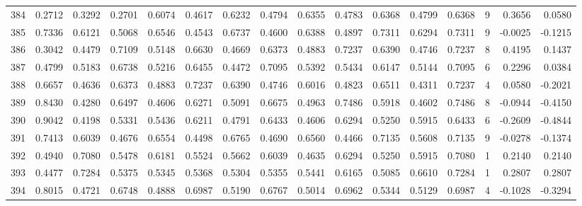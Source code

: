 \begin{tabular}{lrrrrrrrrrrrrrrr}
384 &      0.2712 &  0.3292 &  0.2701 &  0.6074 &  0.4617 &  0.6232 &  0.4794 &  0.6355 &  0.4783 &  0.6368 &   0.4799 &     0.6368 &      9 &                    0.3656 &                     0.0580 \\
385 &      0.7336 &  0.6121 &  0.5068 &  0.6546 &  0.4543 &  0.6737 &  0.4600 &  0.6388 &  0.4897 &  0.7311 &   0.6294 &     0.7311 &      9 &                   -0.0025 &                    -0.1215 \\
386 &      0.3042 &  0.4479 &  0.7109 &  0.5148 &  0.6630 &  0.4669 &  0.6373 &  0.4883 &  0.7237 &  0.6390 &   0.4746 &     0.7237 &      8 &                    0.4195 &                     0.1437 \\
387 &      0.4799 &  0.5183 &  0.6738 &  0.5216 &  0.6455 &  0.4472 &  0.7095 &  0.5392 &  0.5434 &  0.6147 &   0.5144 &     0.7095 &      6 &                    0.2296 &                     0.0384 \\
388 &      0.6657 &  0.4636 &  0.6373 &  0.4883 &  0.7237 &  0.6390 &  0.4746 &  0.6016 &  0.4823 &  0.6511 &   0.4311 &     0.7237 &      4 &                    0.0580 &                    -0.2021 \\
389 &      0.8430 &  0.4280 &  0.6497 &  0.4606 &  0.6271 &  0.5091 &  0.6675 &  0.4963 &  0.7486 &  0.5918 &   0.4602 &     0.7486 &      8 &                   -0.0944 &                    -0.4150 \\
390 &      0.9042 &  0.4198 &  0.5331 &  0.5436 &  0.6211 &  0.4791 &  0.6433 &  0.4606 &  0.6294 &  0.5250 &   0.5915 &     0.6433 &      6 &                   -0.2609 &                    -0.4844 \\
391 &      0.7413 &  0.6039 &  0.4676 &  0.6554 &  0.4498 &  0.6765 &  0.4690 &  0.6560 &  0.4466 &  0.7135 &   0.5608 &     0.7135 &      9 &                   -0.0278 &                    -0.1374 \\
392 &      0.4940 &  0.7080 &  0.5478 &  0.6181 &  0.5524 &  0.5662 &  0.6039 &  0.4635 &  0.6294 &  0.5250 &   0.5915 &     0.7080 &      1 &                    0.2140 &                     0.2140 \\
393 &      0.4477 &  0.7284 &  0.5375 &  0.5345 &  0.5368 &  0.5304 &  0.5355 &  0.5441 &  0.6165 &  0.5085 &   0.6610 &     0.7284 &      1 &                    0.2807 &                     0.2807 \\
394 &      0.8015 &  0.4721 &  0.6748 &  0.4888 &  0.6987 &  0.5190 &  0.6767 &  0.5014 &  0.6962 &  0.5344 &   0.5129 &     0.6987 &      4 &                   -0.1028 &                    -0.3294 \\

\end{tabular}
